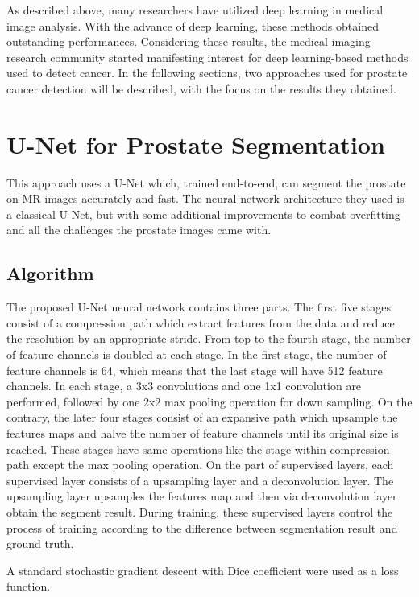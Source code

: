 \documentclass[runningheads,a4paper,11pt]{report}
\begin{document}
As described above, many researchers have utilized deep learning in medical image analysis. With the advance of deep learning, these methods obtained outstanding performances. Considering these results, the medical imaging research community started manifesting interest for deep learning-based methods used to detect cancer. In the following sections, two approaches used for prostate cancer detection will be described, with the focus on the results they obtained.

\section{U-Net for Prostate Segmentation}
\label{section:CNNApproach1}

This approach uses a U-Net
which, trained end-to-end, can segment the prostate on MR images accurately and fast. The neural network architecture they used is a classical U-Net, but with some additional improvements to combat overfitting and all the  challenges the prostate images came with.

\subsection{Algorithm}
\label{section:algorithm}

The proposed U-Net neural network contains three parts. The first five stages consist of a compression path which extract features from the data and reduce the resolution by an appropriate stride. From top to the fourth stage, the number of feature channels is doubled at each stage. In the first stage, the number of feature channels is
64, which means that the last stage will have 512 feature channels. In each stage, a 3x3 convolutions and one 1x1 convolution are performed, followed by one 2x2 max pooling operation for down sampling. On the contrary, the later four stages consist of an expansive path which upsample the features maps and halve the number of feature channels until its original size is reached. These stages have same operations like the stage within compression path except the max pooling operation. On the part of supervised layers, each supervised layer consists of a upsampling layer and a deconvolution layer. The upsampling layer upsamples the features map and then via deconvolution layer obtain the segment result. During training, these supervised layers control
the process of training according to the difference between segmentation result and ground truth.

A standard
stochastic gradient descent with Dice coefficient were used as a loss function.
 \cite{deeplySupervisedCNN}
\end{document}
